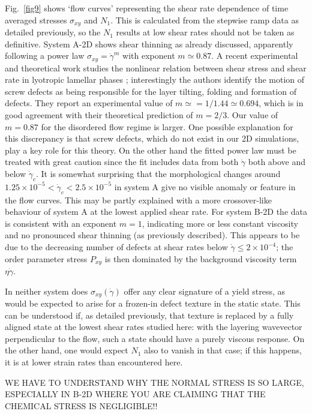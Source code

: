 \documentclass[8.5pt,twoside,twocolumn]{article}
\newcommand{\e}[1]{\times10^{#1}}
\begin{document}
Fig.~\ref{fig9} shows `flow curves' representing the shear rate dependence of time averaged stresses $\sigma_{xy}$ and $N_1$. This is calculated from the stepwise ramp data as detailed previously, so the $N_1$ results at low shear rates should not be taken as definitive. System A-2D shows shear thinning as already discussed, apparently following a power law $\sigma_{xy}=\dot{\gamma}^m$ with exponent $m\simeq 0.87$. A recent experimental and theoretical work studies the nonlinear relation between shear stress and shear rate in lyotropic lamellar phases \cite{Lu08}; interestingly the authors identify the motion of screw defects as being responsible for the layer tilting, folding  and formation of defects. They report an experimental value of $m\simeq=1/1.44\simeq 0.694$, which is in good agreement with their theoretical prediction of $m=2/3$. Our value of $m=0.87$ for the disordered flow regime is larger. One possible explanation for this discrepancy is that screw defects, which do not exist in our 2D simulations, play a key role for this theory. 
On the other hand the fitted power law must be treated with great caution since the fit includes data from both $\dot\gamma$ both above and below $\dot\gamma_c$. It is somewhat surprising that the morphological changes around $1.25\e{-5}<\dot\gamma_c <2.5\e{-5}$ in system A give no visible anomaly or feature in the flow curves.
This may be partly explained with a more crossover-like behaviour of system A at the lowest applied shear rate.
%
For system B-2D the data is consistent with an exponent $m=1$, indicating more or less constant viscosity and no pronounced shear thinning (as previously described). 
This appears to be due to the decreasing number of defects at shear rates below $\dot{\gamma}\le2\e{-4}$; the order parameter stress $P_{xy}$ is then dominated by the background viscosity term $\eta\dot\gamma$. 

In neither system does $\sigma_{xy}(\dot\gamma)$ offer any clear signature of a yield stress, as would be expected to arise for a frozen-in defect texture in the static state. This can be understood if, as detailed previously, that texture is replaced by a fully aligned state at the lowest shear rates studied here: with the layering wavevector perpendicular to the flow, such a state should have a purely viscous response. On the other hand, one would expect $N_1$ also to vanish in that case; if this happens, it is at lower strain rates than encountered here. 

WE HAVE TO UNDERSTAND WHY THE NORMAL STRESS IS SO LARGE, ESPECIALLY IN B-2D WHERE YOU ARE CLAIMING THAT THE CHEMICAL STRESS IS NEGLIGIBLE!!
\end{document}
